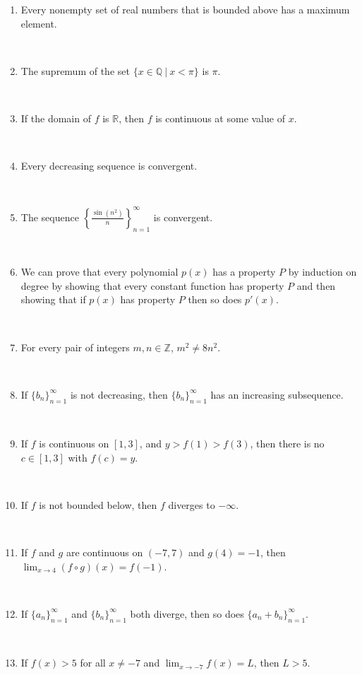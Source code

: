 \documentclass[12pt]{amsart}
\newcommand{\Q}{\mathbb{Q}}
\newcommand{\R}{{\mathbb{R}}}
\newcommand{\Z}{\mathbb{Z}}
\numberwithin{equation}{section}
\theoremstyle{plain} %
\theoremstyle{definition}
\theoremstyle{remark}
\begin{document}
\begin{enumerate}
\



\item Every nonempty set of real numbers that is bounded above has a maximum element.

\

\item The supremum of the set $\{ x\in \Q \ | \ x< \pi\}$ is $\pi$.

\

\item If the domain of $f$ is $\R$, then $f$ is continuous at some value of $x$.

\

\item Every decreasing sequence is convergent.

\



\item The sequence $\displaystyle \left\{ \frac{\sin(n^2)}{n} \right\}_{n=1}^\infty$ is convergent.

\



\item We can prove that every polynomial $p(x)$ has a property $P$ by induction on degree by showing that every constant function has property $P$ and then showing that if $p(x)$ has property $P$ then so does $p'(x)$.

\

\item For every pair of integers $m,n\in \Z$, $m^2 \neq 8 n^2$.

\

\item If $\{b_n\}_{n=1}^\infty$ is not decreasing, then $\{b_n\}_{n=1}^\infty$ has an increasing subsequence.

\

\item If $f$ is continuous on $[1,3]$, and $y> f(1) > f(3)$, then there is no $c\in [1,3]$ with $f(c)=y$.

\

\item If $f$ is not bounded below, then $f$ diverges to $-\infty$.

\

\item If $f$ and $g$ are continuous on $(-7,7)$ and $ g(4) = -1$, then $\displaystyle\lim_{x\to 4} (f\circ g)(x) = f(-1)$.

\

\item If $\{a_n\}_{n=1}^\infty$ and $\{b_n\}_{n=1}^\infty$ both diverge, then so does $\{a_n+b_n\}_{n=1}^\infty$.

\

\item If $f(x) > 5$ for all $x\neq -7$ and $\displaystyle \lim_{x\to -7} f(x) = L$, then $L>5$.



\end{enumerate}
\end{document}
